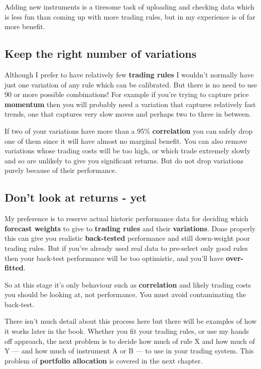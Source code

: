 Adding new instruments is a tiresome task of uploading and checking data which is less fun than coming up with more trading rules, but in my experience is of far more benefit.

\subsection*{Keep the right number of variations}

Although I prefer to have relatively few \textbf{trading rules} I wouldn't normally have just one variation of any rule which can be calibrated. But there is no need to use 90 or more possible combinations! For example if you're trying to capture price \textbf{momentum} then you will probably need a variation that captures relatively fast trends, one that captures very slow moves and perhaps two to three in between.

If two of your variations have more than a 95\% \textbf{correlation} you can safely drop one of them since it will have almost no marginal benefit. You can also remove variations whose trading costs will be too high, or which trade extremely slowly and so are unlikely to give you significant returns. But do not drop variations purely because of their performance.

\subsection*{Don't look at returns - yet}

My preference is to reserve actual historic performance data for deciding which \textbf{forecast weights} to give to \textbf{trading rules} and their \textbf{variations}. Done properly this can give you realistic \textbf{back-tested} performance and still down-weight poor trading rules. But if you've already used real data to pre-select only good rules then your back-test performance will be too optimistic, and you'll have \textbf{over-fitted}.

So at this stage it's only behaviour such as \textbf{correlation} and likely trading costs you should be looking at, not performance. You must avoid contaminating the back-test.

There isn't much detail about this process here but there will be examples of how it works later in the book. Whether you fit your trading rules, or use my hands off approach, the next problem is to decide how much of rule X and how much of Y --- and how much of instrument A or B --- to use in your trading system. This problem of \textbf{portfolio allocation} is covered in the next chapter.
